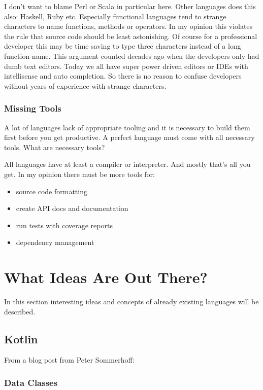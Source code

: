 \documentclass[a4paper,12pt]{report}
\begin{document}
I don't want to blame Perl or Scala in particular here. Other languages does this also: Haskell, Ruby etc. Especially functional languages tend to strange characters to name functions, methods or operators. In my opinion this violates the rule that source code should be least astonishing. Of course for a professional developer this may be time saving to type three characters instead of a long function name. This argument counted decades ago when the developers only had dumb text editors. Today we all have super power driven editors or IDEs with intellisense and auto completion. So there is no reason to confuse developers without years of experience with strange characters.

\subsection{Missing Tools}

A lot of languages lack of appropriate tooling and it is necessary to build them first before you get productive. A perfect language must come with all necessary tools. What are necessary tools?

All languages have at least a compiler or interpreter. And mostly that's all you get. In my opinion there must be more tools for:

\begin{itemize}
    \item source code formatting
    \item create API docs and documentation
    \item run tests with coverage reports
    \item dependency management
\end{itemize}

\chapter{What Ideas Are Out There?}

In this section interesting ideas and concepts of already existing languages will be described.

\section{Kotlin}

From a blog post from Peter Sommerhoff\cite{kotlin-sommerhoff}:

\subsection{Data Classes}
\end{document}

